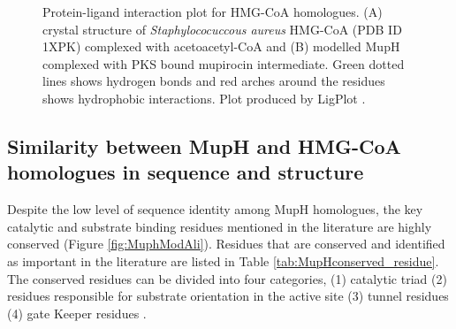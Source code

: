 			\setlength\fboxsep{5pt}
			\setlength\fboxrule{1.5pt}
			\begin{figure}
			\centering
			\caption[Protein-ligand interaction plot for HMG-CoA homologues.]{Protein-ligand interaction plot for HMG-CoA homologues. (A) crystal structure of \textit{Staphylococuccous aureus} HMG-CoA (PDB ID 1XPK) complexed with acetoacetyl-CoA and (B) modelled MupH complexed with PKS bound mupirocin intermediate. Green dotted lines shows hydrogen bonds and red arches around the residues shows hydrophobic interactions. Plot produced by LigPlot \parencite{Wallace1995}.}
			\label{fig:1XPKvsMupH}
			\end{figure}				
	
	\subsection{Similarity between MupH and HMG-CoA homologues in sequence and structure}
	\label{sec:MupHandHomologue}
	Despite the low level of sequence identity among MupH homologues, the key catalytic and substrate binding residues mentioned in the literature are highly conserved (Figure \ref{fig:MuphModAli}). Residues that are conserved and  identified as important in the literature are listed in Table \ref{tab:MupHconserved_residue}. The conserved residues can be divided into four categories, (1) catalytic triad (2) residues responsible for substrate orientation in the active site (3) tunnel residues (4) gate Keeper residues \parencite{Misra1996, Bahnson2004,Theisen2004,Steussy2005,  Shafqat2010}.
	
